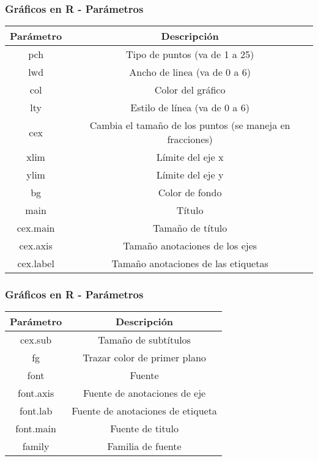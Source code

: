 \documentclass[12pt]{beamer}
\begin{document}
	\begin{frame}
		\frametitle{Gráficos en R - Parámetros}
		
		\begin{table}
			\begin{tabular}{cc}
				\hline
				Parámetro& Descripción \\
				\hline
				pch&  Tipo de puntos (va de 1 a 25)\\
				
				lwd&Ancho de linea (va de 0 a 6) \\
				
				col&  Color del gráfico \\
				
				lty &  Estilo de línea (va de 0 a 6)\\
				
				cex& Cambia el tamaño de los puntos (se maneja en fracciones)\\
				
				xlim&  Límite del eje x \\
				
				ylim & Límite del eje y  \\
				
				bg & Color de fondo  \\
				
				main & Título  \\
				
				cex.main & Tamaño  de título  \\
				
				cex.axis & Tamaño  anotaciones de los ejes\\
				
				cex.label & Tamaño  anotaciones de las etiquetas\\
				
				\hline
			\end{tabular}
		\end{table}
	\end{frame}

	\begin{frame}
		\frametitle{Gráficos en R - Parámetros}
		\begin{table}
			\begin{tabular}{cc}
				\hline
				Parámetro& Descripción \\
				\hline
				cex.sub&  Tamaño  de subtítulos\\
				fg&  Trazar color de primer plano\\
				font&  Fuente\\
				font.axis&  Fuente de anotaciones de eje\\
				font.lab&  Fuente de anotaciones de etiqueta\\
				font.main&  Fuente de titulo\\
				family&  Familia de fuente\\
				\hline
			\end{tabular}
		\end{table}
	\end{frame}
\end{document}
